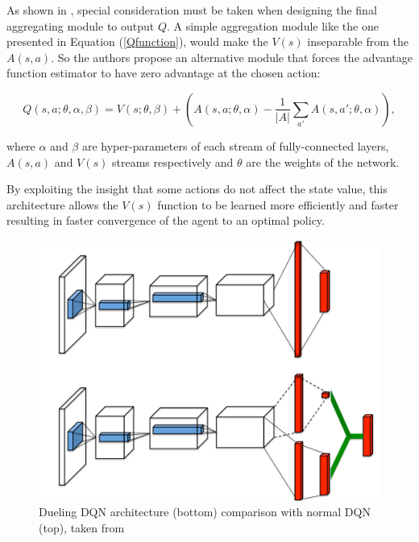 As shown in \cite{duelingDQN}, special consideration must be taken when designing the final aggregating module to output $Q$. A simple aggregation module like the one presented in Equation (\ref{Qfunction}), would make the $V(s)$ inseparable from the $A(s, a)$. So the authors propose an alternative module that forces the advantage function estimator to have zero advantage at the chosen action:

\begin{equation}
    Q(s,a;\theta,\alpha,\beta) = V(s; \theta, \beta) + (A(s,a;\theta,\alpha) - \frac{1}{|A|}\sum\limits_{a'}A(s, a'; \theta, \alpha)) ,
\end{equation}

where $\alpha$ and $\beta$ are hyper-parameters of each stream of fully-connected layers, $A(s,a)$ and $V(s)$ streams respectively and $\theta$ are the weights of the network.

By exploiting the insight that some actions do not affect the state value, this architecture allows the $V(s)$ function to be learned more efficiently and faster resulting in faster convergence of the agent to an optimal policy.

\begin{figure}[H]
  \centering
  \includegraphics[width=\textwidth]{images/duelingDQN.png}
  \caption{Dueling DQN architecture (bottom) comparison with normal DQN (top), taken from \cite{duelingDQN}} \label{duelDQNImag}
\end{figure}

